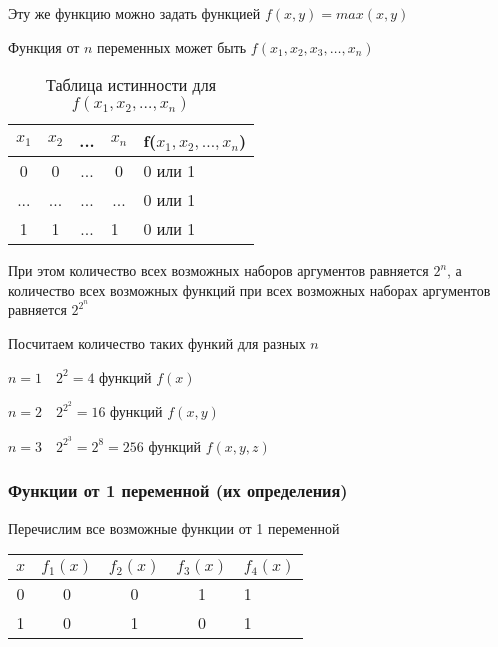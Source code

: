 \documentclass[russian]{lecture-notes}
\begin{document}
\begin{sloppypar}
\begin{example}
	Эту же функцию можно задать функцией $f(x,y) = max(x,y)$
\end{example}

\begin{proposition}
    Функция от $n$ переменных может быть $f(x_1, x_2, x_3, \dots, x_n)$
    
    \begin{table}[h!]
  	  	\centering
		\begin{tabular}{|c|c|c|c|l|}
			\hline
			$x_1$ & $x_2$ & ... & $x_n$                   & f($x_1, x_2, \dots, x_n$) \\ \hline
			0    & 0    & ... & 0                      & 0 или 1                  \\ \hline
			...  & ...  & ... & ...                    & 0 или 1                  \\ \hline
			1    & 1    & ... & \multicolumn{1}{l|}{1} & 0 или 1                  \\ \hline
		\end{tabular}
		\caption{Таблица истинности для $f(x_1,x_2, \dots, x_n)$}
	\end{table}
		
	При этом количество всех возможных наборов аргументов равняется $2^n$, а количество всех возможных функций при всех возможных наборах аргументов равняется $2^{2^n}$
\end{proposition}

\begin{corollary}
    Посчитаем количество таких функий для разных $n$
    
    $n = 1 \quad 2^2 = 4$ функций $f(x)$
    
	$n = 2 \quad 2^{2^2} = 16$ функций $f(x,y)$

	$n = 3 \quad 2^{2^3} = 2^8 = 256$ функций $f(x,y,z)$
\end{corollary}

\subsubsection{Функции от 1 переменной (их определения)}

\begin{example}
	Перечислим все возможные функции от 1 переменной
	
	\begin{table}[h!]
	\centering
		\begin{tabular}{|c|c|c|c|l|}
			\hline
			$x$ & $f_1(x)$ & $f_2(x)$ & $f_3(x)$ & $f_4(x)$ \\ \hline
			0 & 0       & 0       & 1       & 1       \\ \hline
			1 & 0       & 1       & 0       & 1       \\ \hline
		\end{tabular}
	\end{table}
	

\end{example}
\end{sloppypar}
\end{document}
